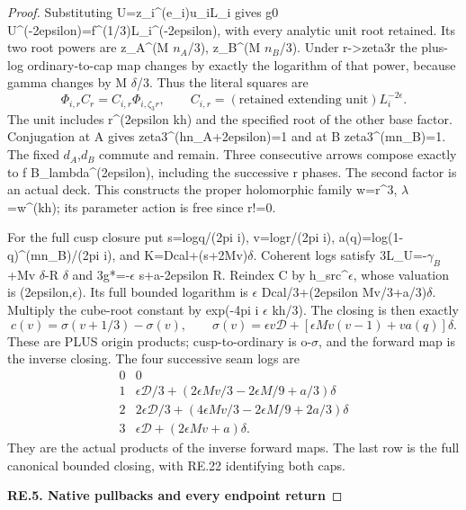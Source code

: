 \begin{proof}
Substituting U=z\_i\^{}(e\_i)u\_iL\_i gives
g0 U\^{}(-2epsilon)=f\^{}(1/3)L\_i\^{}(-2epsilon), with every analytic unit root
retained. Its two root powers are z\_A\^{}(M \(n_A\)/3), z\_B\^{}(M \(n_B\)/3).
Under r-\textgreater zeta3r the plus-log ordinary-to-cap map changes by exactly
the logarithm of that power, because gamma changes by M \(\delta\)/3.
Thus the literal squares are
\[
\Phi_{i,r}C_r=C_{i,r}\Phi_{i,\zeta_3r},\qquad
C_{i,r}=(\text{retained extending unit})L_i^{-2\epsilon}.
\tag{RE.22}
\]
The unit includes r\^{}(2epsilon kh) and the specified root of the other
base factor. Conjugation at A gives zeta3\^{}(hn\_A+2epsilon)=1 and at B
zeta3\^{}(mn\_B)=1. The fixed \(d_A\),\(d_B\) commute and remain. Three consecutive
arrows compose exactly to f B\_lambda\^{}(2epsilon), including the successive
r phases. The second factor is an actual deck. This constructs the
proper holomorphic family w=r\^{}3, \(\lambda\)=w\^{}(kh); its parameter action
is free since r!=0.

For the full cusp closure put s=logq/(2pi i), v=logr/(2pi i),
a(q)=log(1-q)\^{}(mn\_B)/(2pi i), and K=Dcal+(s+2Mv)\(\delta\). Coherent
logs satisfy 3L\_U=-\(\gamma_B\)+Mv \(\delta\)-R \(\delta\) and
3g*=-\(\epsilon\) s+a-2epsilon R. Reindex C by h\_src\^{}\(\epsilon\), whose
valuation is (2epsilon,\(\epsilon\)). Its full bounded logarithm is
\(\epsilon\) Dcal/3+(2epsilon Mv/3+a/3)\(\delta\). Multiply the cube-root constant
by exp(-4pi i \(\epsilon\) kh/3). The closing is then exactly
\[
c(v)=\sigma(v+1/3)-\sigma(v),\qquad
\sigma(v)=\epsilon v\mathcal D+
                [\epsilon Mv(v-1)+v a(q)]\delta.\tag{RE.23}
\]
These are PLUS origin products; cusp-to-ordinary is o-\(\sigma\), and the
forward map is the inverse closing. The four successive seam logs are
\[
\begin{array}{c|l}
0&0\\
1&\epsilon\mathcal D/3+(2\epsilon Mv/3-2\epsilon M/9+a/3)\delta\\
2&2\epsilon\mathcal D/3+(4\epsilon Mv/3-2\epsilon M/9+2a/3)\delta\\
3&\epsilon\mathcal D+(2\epsilon Mv+a)\delta .
\end{array}\tag{RE.24}
\]
They are the actual products of the inverse forward maps. The last row
is the full canonical bounded closing, with RE.22 identifying both caps.

\par

\medskip\noindent\textbf{RE.5. Native pullbacks and every endpoint return}


\end{proof}
